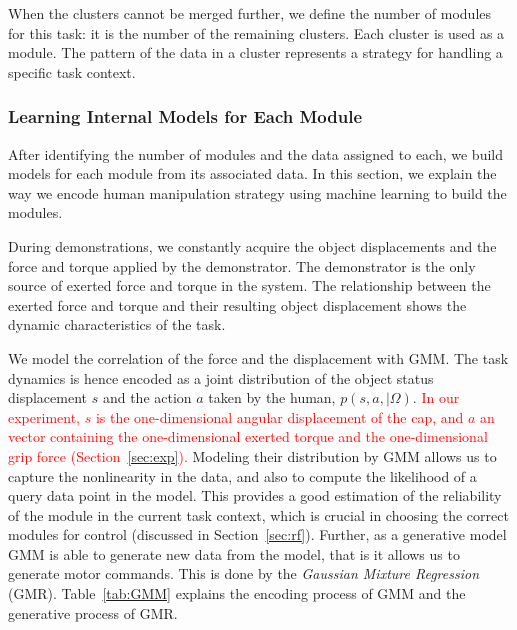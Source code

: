 When the clusters cannot be merged further, we define the number of
modules for this task: it is the number of the remaining
clusters. Each cluster is used as a module. The pattern of the data in
a cluster represents a strategy for handling a specific task context.

\subsubsection{Learning Internal Models for Each Module}
\label{sec:model}
After identifying the number of modules and the data assigned to each,
we build models for each module from its associated data. In this
section, we explain the way we encode human manipulation strategy
using machine learning to build the modules.

During demonstrations, we constantly acquire the object displacements
and the force and torque applied by the demonstrator. The demonstrator
is the only source of exerted force and torque in the system. The
relationship between the exerted force and torque and their resulting
object displacement shows the dynamic characteristics of the task.

We model the correlation of the force and the displacement with
GMM. The task dynamics is hence encoded as a joint distribution of the
object status displacement $s$ and the action $a$ taken by the human,
$p(s,a,{\mid}{\Omega})$. \textcolor{red}{In our experiment, $s$ is the one-dimensional
angular displacement of the cap, and $a$ an vector containing the one-dimensional
exerted torque and the one-dimensional grip force (Section~\ref{sec:exp}).} Modeling their
distribution by GMM allows us to capture the nonlinearity in the data,
and also to compute the likelihood of a query data point in the
model. This provides a good estimation of the reliability of the
module in the current task context, which is crucial in choosing the
correct modules for control (discussed in
Section~\ref{sec:rf}). Further, as a generative model GMM is able to
generate new data from the model, that is it allows us to generate
motor commands. This is done by the {\em Gaussian Mixture Regression}
(GMR). Table~\ref{tab:GMM} explains the encoding process of GMM and
the generative process of GMR.  %

